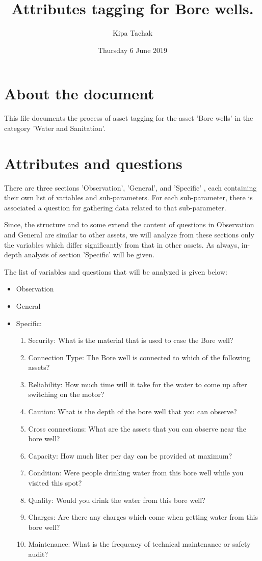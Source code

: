 \documentclass[oneside,twocolumn]{article}
\title{Attributes tagging for Bore wells.}
\author{Kipa Tachak}
\date{Thursday  6 June 2019}
\begin{document}
\maketitle

\section{About the document}
This file documents the process of asset tagging for the asset
'Bore wells' in the category 'Water and
Sanitation'.
\section{Attributes and questions}
There are three sections 'Observation', 'General', and 'Specific'
, each containing their own list of variables and sub-parameters.
For each sub-parameter, there is associated a question for
gathering data related to that sub-parameter.

Since, the structure and to some extend the content of questions
in Observation and General are similar to other assets, we will
analyze from these sections only the variables which differ
significantly from that in other assets. As always, in-depth analysis of section 'Specific' will be given.

The list of variables and questions that will be analyzed is given below:
\begin{itemize}
	\item Observation
	\item General
	\item Specific:
	\begin{enumerate}
		\item Security: What is the material that is used to case the Bore well?
		\item Connection Type: The Bore well is connected to which of the following assets?
		\item Reliability: How much time will it take for the water to come up after switching on the motor?
		\item Caution: What is the depth of the bore well that you can observe?
		\item Cross connections: What are the assets that you can observe near the bore well?
		\item Capacity: How much liter per day can be provided at maximum?
		\item Condition: Were people drinking water from this bore well while you visited this spot?
		\item Quality: Would you drink the water from this bore well?
		\item Charges: Are there any charges which come when getting water from this bore well?
		\item Maintenance: What is the frequency of technical maintenance or safety audit? 
	\end{enumerate}
\end{itemize}
\end{document}
